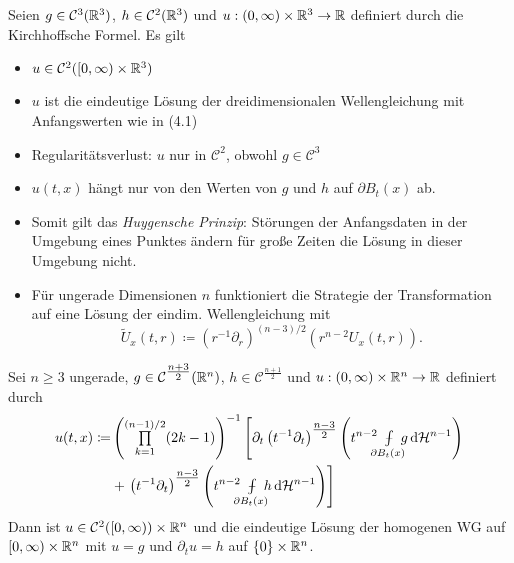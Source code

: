 \documentclass{cheat-sheet}
\newcommand{\HM}{\mathcal{H}} %
\def\Xint#1{\mathchoice
   {\XXint\displaystyle\textstyle{#1}}%
   {\XXint\textstyle\scriptstyle{#1}}%
   {\XXint\scriptstyle\scriptscriptstyle{#1}}%
   {\XXint\scriptscriptstyle\scriptscriptstyle{#1}}%
   \!\int}
\def\XXint#1#2#3{{\setbox0=\hbox{$#1{#2#3}{\int}$}
     \vcenter{\hbox{$#2#3$}}\kern-.5\wd0}}
\def\dashint{\Xint-}
\newcommand{\mymvint}[2]{{\textstyle \dashint\limits_{#1}^{#2}}}
\newcommand{\MVInt}[4]{\mymvint{#1}{#2} #3 \,\d #4}
\begin{document}
\begin{satz}
  Seien $g \in \mathcal{C}^3(\mathbb{R}^3)$, $h \in \mathcal{C}^2(\mathbb{R}^3)$ und $u : \left( 0, \infty \right) \times \mathbb{R}^3 \to \mathbb{R}$ definiert durch die Kirchhoffsche Formel. Es gilt
  \begin{itemize}
    \item $u \in \mathcal{C}^2(\left[ 0, \infty \right) \times \mathbb{R}^3)$
    \item $u$ ist die eindeutige Lösung der dreidimensionalen Wellengleichung mit Anfangswerten wie in (4.1)
  \end{itemize}
\end{satz}

\begin{bemn}
  \begin{itemize}
    \item Regularitätsverlust: $u$ nur in $\mathcal{C}^2$, obwohl $g \in \mathcal{C}^3$
    \item $u(t, x)$ hängt nur von den Werten von $g$ und $h$ auf $\partial B_t(x)$ ab.
    \item Somit gilt das \emph{Huygensche Prinzip}: Störungen der Anfangsdaten in der Umgebung eines Punktes ändern für große Zeiten die Lösung in dieser Umgebung nicht.
    \item Für ungerade Dimensionen $n$ funktioniert die Strategie der Transformation auf eine Lösung der eindim. Wellengleichung mit
    \[ \widetilde{U}_x(t, r) \coloneqq (r^{-1} \partial_r)^{(n-3)/2} (r^{n-2} U_x(t, r)). \]
  \end{itemize}
\end{bemn}

\begin{satz}
  Sei $n \geq 3$ ungerade, $g \in \mathcal{C}^{\tfrac{n+3}{2}}(\mathbb{R}^n)$, $h \in \mathcal{C}^{\tfrac{n+1}{2}}$ und $u : \left( 0, \infty \right) \times \mathbb{R}^n \to \mathbb{R}$ definiert durch
  \begin{align*}
    u(t, x) \coloneqq & \left( \prod_{k=1}^{(n-1)/2} (2k - 1) \right)^{-1} \left[ \partial_t \left( t^{-1} \partial_t \right)^{\tfrac{n-3}{2}} \left( t^{n-2} \enspace \MVInt{\mathclap{\partial B_t(x)}}{}{\enspace g}{\HM^{n-1}} \right) \right. \\
    & + \left. \left( t^{-1} \partial_t \right)^{\tfrac{n-3}{2}} \left( t^{n-2} \enspace \MVInt{\mathclap{\partial B_t(x)}}{}{\enspace h}{\HM^{n-1}} \right) \right]
  \end{align*}
  Dann ist $u \in \mathcal{C}^2(\left[ 0, \infty \right)) \times \mathbb{R}^n$ und die eindeutige Lösung der homogenen WG auf $\left[ 0, \infty \right) \times \mathbb{R}^n$ mit $u = g$ und $\partial_t u = h$ auf $\{ 0 \} \times \mathbb{R}^n$.
\end{satz}
\end{document}
